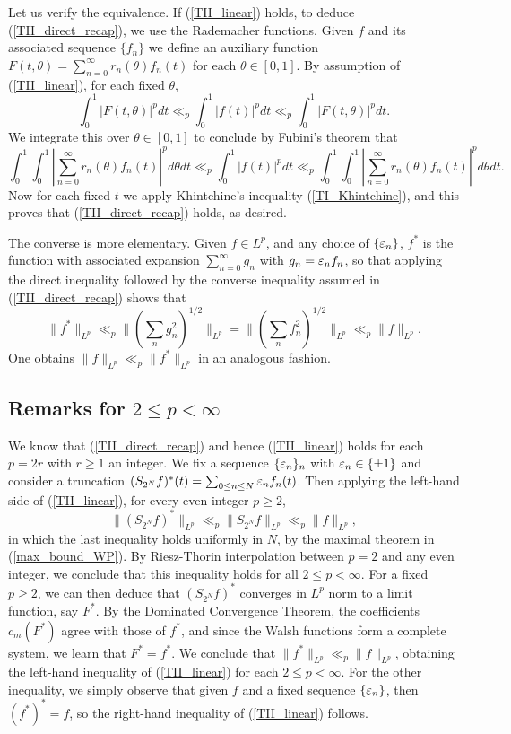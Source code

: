 \documentclass[oneside,11pt]{amsart}
\begin{document}
Let us verify the equivalence. If (\ref{TII_linear}) holds, to deduce (\ref{TII_direct_recap}), we use the Rademacher functions. Given $f$ and its associated sequence $\{f_n\}$ we define an auxiliary function $F(t,\theta) = \sum_{n=0}^\infty r_n(\theta) f_n(t)$ for each $\theta \in [0,1]$. By assumption of (\ref{TII_linear}), for each fixed $\theta$, 
 \[  \int_0^1 | F(t,\theta)|^p dt \ll_p \int_0^1 |f(t)|^p dt \ll_p \int_0^1 | F(t,\theta)|^p dt.\]
We integrate this over $\theta \in [0,1]$ to conclude by Fubini's theorem that
\[ \int_0^1 \int_0^1 | \sum_{n=0}^\infty r_n(\theta) f_n(t)|^p d\theta dt \ll_p \int_0^1 |f(t)|^p dt \ll_p \int_0^1 \int_0^1 | \sum_{n=0}^\infty r_n(\theta) f_n(t)|^p d\theta dt.\]
Now for each fixed $t$ we apply Khintchine's inequality (\ref{TI_Khintchine}), and this proves that (\ref{TII_direct_recap}) holds, as desired.

The converse is more elementary. Given $f \in L^p$, and any choice of $\{\varepsilon_n\}$, $f^*$ is the function with associated expansion $\sum_{n=0}^\infty g_n$ with $g_n=\varepsilon_n f_n$, so that applying the direct inequality followed by the converse inequality assumed in (\ref{TII_direct_recap}) shows that
\[  \| f^* \|_{L^p} \ll_p \| (\sum_n g_n^2)^{1/2} \|_{L^p}  =\| (\sum_n f_n^2)^{1/2} \|_{L^p} \ll_p \|f\|_{L^p}.   \]
One obtains $\|f\|_{L^p} \ll_p \|f^*\|_{L^p}$ in an analogous fashion.

 
\subsection{Remarks for $2 \leq  p < \infty$} 
We know that (\ref{TII_direct_recap}) and hence (\ref{TII_linear}) holds for each $p=2r$ with $r \geq1$ an integer. 
 We fix a sequence $\{ \varepsilon_n\}_n$ with $\varepsilon_n \in \{\pm 1\}$ and consider a truncation $(S_{2^N}f)^* (t)  = \sum_{0 \leq n  \leq N} \varepsilon_n f_n(t)$. 
 Then applying the left-hand side of (\ref{TII_linear}),  for every even integer $p \geq 2$, 
 \[ \|(S_{2^N}f)^* \|_{L^p} \ll_p \| S_{2^N}f\|_{L^p} \ll_p\|f\|_{L^p},\]
 in which the last inequality holds  uniformly in $N$, by the maximal theorem in (\ref{max_bound_WP}). 
By Riesz-Thorin interpolation between $p=2$ and any even integer, we conclude that this inequality holds for all $2 \leq p < \infty$. For a fixed $p \geq 2$, we can then deduce  that $(S_{2^N}f)^*$ converges in $L^p$ norm to a limit function, say $F^*$. By the Dominated Convergence Theorem, the  coefficients $c_m(F^*)$ agree with those of $f^*$, and since the Walsh functions form a complete system, we learn that $F^*=f^*$. We conclude that $\|f^*\|_{L^p} \ll_p \|f\|_{L^p}$, obtaining the left-hand  inequality of (\ref{TII_linear}) for each $2\leq p < \infty$.
For the other inequality, we simply observe that given $f$  and a fixed sequence $\{\varepsilon_n\}$, then $(f^*)^*=f$, so the right-hand inequality of (\ref{TII_linear}) follows.
 
\end{document}
